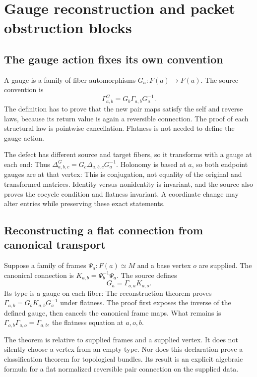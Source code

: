 \clearpage
\section{Gauge reconstruction and packet obstruction blocks}
\subsection{The gauge action fixes its own convention}
A gauge is a family of fiber automorphisms $G_a:F(a)\to F(a)$. The source convention is
\[
 \Gamma^G_{a,b}=G_b\Gamma_{a,b}G_a^{-1}.
\]
The definition has to prove that the new pair maps satisfy the self and reverse laws, because its return value is again a reversible connection.
The proof of each structural law is pointwise cancellation. Flatness is not needed to define the gauge action.

The defect has different source and target fibers, so it transforms with a gauge at each end:
Thus $\Delta^G_{a,b,c}=G_c\Delta_{a,b,c}G_a^{-1}$. Holonomy is based at $a$, so both endpoint gauges are at that vertex:
This is conjugation, not equality of the original and transformed matrices. Identity versus nonidentity is invariant, and the source also proves the cocycle condition and flatness invariant. A coordinate change may alter entries while preserving these exact statements.

\subsection{Reconstructing a flat connection from canonical transport}
Suppose a family of frames $\Psi_a:F(a)\simeq M$ and a base vertex $o$ are supplied. The canonical connection is $K_{a,b}=\Psi_b^{-1}\Psi_a$. The source defines
\[
 G_a=\Gamma_{o,a}K_{a,o}.
\]
Its type is a gauge on each fiber:
The reconstruction theorem proves $\Gamma_{a,b}=G_bK_{a,b}G_a^{-1}$ under flatness.
The proof first exposes the inverse of the defined gauge, then cancels the canonical frame maps. What remains is $\Gamma_{o,b}\Gamma_{a,o}=\Gamma_{a,b}$, the flatness equation at $a,o,b$.

The theorem is relative to supplied frames and a supplied vertex. It does not silently choose a vertex from an empty type. Nor does this declaration prove a classification theorem for topological bundles. Its result is an explicit algebraic formula for a flat normalized reversible pair connection on the supplied data.

